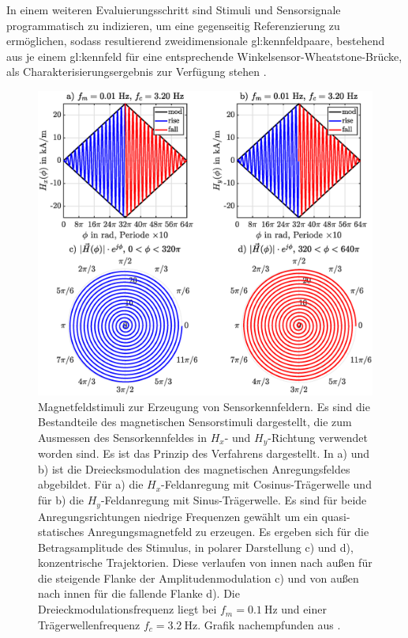 \newline
In einem weiteren Evaluierungsschritt sind Stimuli und Sensorsignale programmatisch zu indizieren, um eine gegenseitig Referenzierung zu ermöglichen, sodass resultierend zweidimensionale \gls{gl:kennfeldpaar}e, bestehend aus je einem \gls{gl:kennfeld} für eine entsprechende Winkelsensor-Wheatstone-Brücke, als Charakterisierungsergebnis zur Verfügung stehen \cite{Schuethe2019}.


\clearpage


\begin{figure}[tbph]
	\centering
	\includegraphics[width=\linewidth]{chapters/images/2-Grundlagen/Magnetfeldstimulus_Kennfeldmethode}
	\caption[Magnetfeldstimuli zur Erzeugung von Sensorkennfeldern]{Magnetfeldstimuli zur Erzeugung von 
		Sensorkennfeldern. Es sind die Bestandteile des magnetischen Sensorstimuli dargestellt, die zum Ausmessen des 
		Sensorkennfeldes in $H_x$- und $H_y$-Richtung verwendet worden sind. Es ist das Prinzip des Verfahrens 
		dargestellt. In a) und b) ist die Dreiecksmodulation des magnetischen Anregungsfeldes abgebildet. Für a) die 
		$H_x$-Feldanregung mit Cosinus-Trägerwelle und für b) die $H_y$-Feldanregung mit Sinus-Trägerwelle. Es sind für 
		beide Anregungsrichtungen niedrige Frequenzen gewählt um ein quasi-statisches Anregungsmagnetfeld zu erzeugen. 
		Es ergeben sich für die Betragsamplitude des Stimulus, in polarer Darstellung c) und d), konzentrische 
		Trajektorien. Diese verlaufen von innen nach außen für die steigende Flanke der Amplitudenmodulation c) und von 
		außen nach innen für die fallende Flanke d). Die Dreieckmodulationsfrequenz liegt bei $f_m = \SI{0.1}{\hertz}$ 
		und einer Trägerwellenfrequenz $f_c = \SI{3.2}{\hertz}$. Grafik nachempfunden aus \cite{Schuethe2019}.}
	\label{fig:magnetfeldstimuluskennfeldmethode}
\end{figure}


